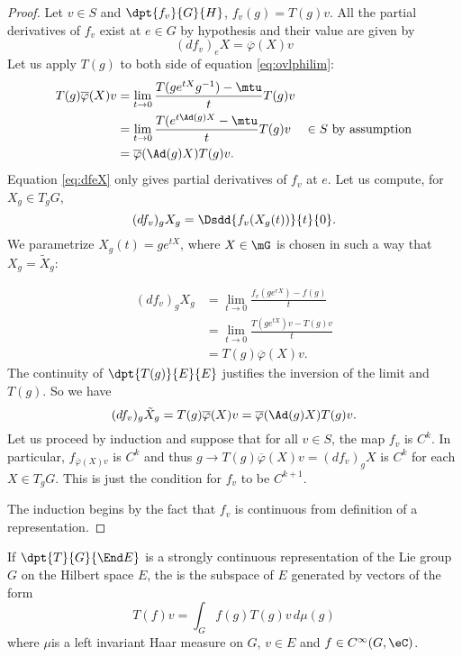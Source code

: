 \begin{proof}
Let $v\in S$ and $\dpt{ f_v }{ G }{ H }$, $f_v(g)=T(g)v$. All the partial derivatives of $f_v$ exist at $e\in G$ by hypothesis and their value are given by
\begin{equation} \label{eq:dfeX}
  (df_v)_eX=\overline{ \varphi }(X)v 
\end{equation}
Let us apply $T(g)$ to both side of equation \eqref{eq:ovlphilim}:
\begin{equation}
\begin{aligned}
   T(g)\overline{ \varphi }(X)v&=\lim_{t\to 0}\frac{ T(ge^{tX}g^{-1})-\mtu }{ t }T(g)v\\
				&=\lim_{t\to 0}\frac{ T(e^{t\Ad(g)X}-\mtu }{ t }T(g)v&\in S\textrm{ by assumption}\\
				&=\overline{ \varphi }(\Ad(g)X)T(g)v.
\end{aligned}
\end{equation}
Equation \eqref{eq:dfeX} only gives partial derivatives of $f_v$ at $e$. Let us compute, for $X_g\in T_gG$,
\[ 
  (df_v)_gX_g=\Dsdd{ f_v(X_g(t)) }{t}{0}.
\]
We parametrize $X_g(t)=ge^{tX}$, where $X\in\mG$ is chosen in such a way that $X_g= \tilde X_g$:

 \begin{equation}
\begin{split}
  (df_v)_gX_g&=\lim_{t\to0}\frac{ f_v(ge^{rX})-f(g) }{ t }\\
		&=\lim_{t\to 0}\frac{ T(ge^{tX})v-T(g)v }{ t }\\
		&=T(g)\overline{ \varphi }(X)v.
\end{split}
\end{equation}
The continuity of $\dpt{ T(g) }{ E }{ E }$ justifies the inversion of the limit and $T(g)$. So we have
\[ 
  (df_v)_g\tilde X_g=T(g)\overline{ \varphi }(X)v=\overline{ \varphi }(\Ad(g)X)T(g)v.
\]
Let us proceed by induction and suppose that for all $v\in S$, the map $f_v$ is $C^k$. In particular, $f_{\overline{ \varphi }(X)v}$ is $C^k$ and thus $g\to T(g)\overline{ \varphi }(X)v=(df_v)_gX$ is $C^k$ for each $X\in T_gG$. This is just the condition for $f_v$ to be $C^{k+1}$.

The induction begins by the fact that $f_v$ is continuous from definition of a representation.

\end{proof}

\begin{definition}

If $\dpt{ T }{ G }{ \End E }$ is a strongly continuous representation of the Lie group $G$ on the Hilbert space $E$, the  is the subspace of $E$ generated by vectors of the form
\begin{equation}
  T(f)v=\int_Gf(g)T(g)v\,d\mu(g)
\end{equation}
where $\mu$is a left invariant Haar measure on $G$, $v\in E$ and $f\in C^{\infty}(G,\eC)$.

\end{definition}

